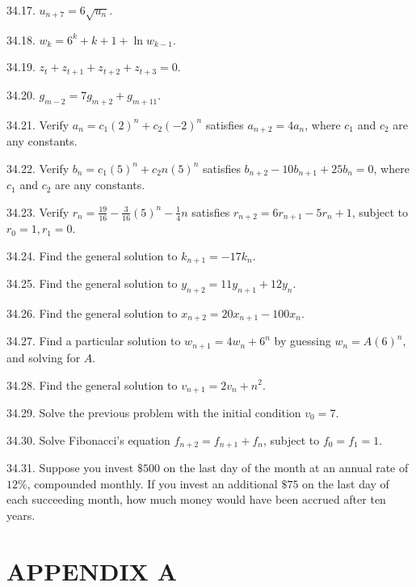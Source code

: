 \documentclass[10pt]{article}
\begin{document}
34.17. $u_{n+7}=6 \sqrt{u_{n}}$.

34.18. $w_{k}=6^{k}+k+1+\ln w_{k-1}$.

34.19. $z_{t}+z_{t+1}+z_{t+2}+z_{t+3}=0$.

34.20. $g_{m-2}=7 g_{m+2}+g_{m+11}$.

34.21. Verify $a_{n}=c_{1}(2)^{n}+c_{2}(-2)^{n}$ satisfies $a_{n+2}=4 a_{n}$, where $c_{1}$ and $c_{2}$ are any constants.

34.22. Verify $b_{n}=c_{1}(5)^{n}+c_{2} n(5)^{n}$ satisfies $b_{n+2}-10 b_{n+1}+25 b_{n}=0$, where $c_{1}$ and $c_{2}$ are any constants.

34.23. Verify $r_{n}=\frac{19}{16}-\frac{3}{16}(5)^{n}-\frac{1}{4} n$ satisfies $r_{n+2}=6 r_{n+1}-5 r_{n}+1$, subject to $r_{0}=1, r_{1}=0$.

34.24. Find the general solution to $k_{n+1}=-17 k_{n}$.

34.25. Find the general solution to $y_{n+2}=11 y_{n+1}+12 y_{n}$.

34.26. Find the general solution to $x_{n+2}=20 x_{n+1}-100 x_{n}$.

34.27. Find a particular solution to $w_{n+1}=4 w_{n}+6^{n}$ by guessing $w_{n}=A(6)^{n}$, and solving for $A$.

34.28. Find the general solution to $v_{n+1}=2 v_{n}+n^{2}$.

34.29. Solve the previous problem with the initial condition $v_{0}=7$.

34.30. Solve Fibonacci's equation $f_{n+2}=f_{n+1}+f_{n}$, subject to $f_{0}=f_{1}=1$.

34.31. Suppose you invest $\$ 500$ on the last day of the month at an annual rate of $12 \%$, compounded monthly. If you invest an additional $\$ 75$ on the last day of each succeeding month, how much money would have been accrued after ten years.

\section*{APPENDIX A}
\end{document}

